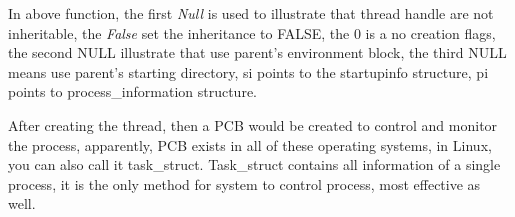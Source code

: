 \documentclass[10pt,draftclsnofoot,peerreview,letterpaper,onecolumn,]{IEEEtran}
\begin{document}
In above function, the first \emph{Null} is used to illustrate that thread handle are not inheritable, the \emph{False} set the inheritance to FALSE, the 0 is a no creation flags, the second NULL illustrate that use parent's environment block, the third NULL means use parent's starting directory, si points to the startupinfo structure, pi points to process\_information structure.

%

After creating the thread, then a PCB would be created to control and monitor the process, apparently, PCB exists in all of these operating systems, in Linux, you can also call it task\_struct. Task\_struct contains all information of a single process, it is the only method for system to control process, most effective as well.
\end{document}
